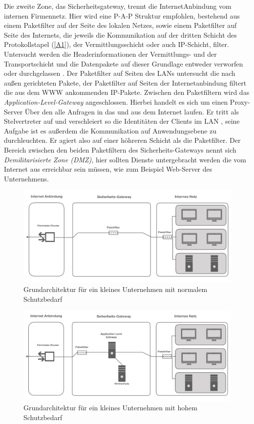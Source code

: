 Die zweite Zone, das Sicherheitsgateway, trennt die InternetAnbindung vom internen Firmennetz. Hier wird eine P-A-P Struktur empfohlen, bestehend aus einem Paketfilter auf der Seite des lokalen Netzes, sowie einem Paketfilter auf Seite des Internets, die jeweils die Kommunikation auf der dritten Schicht des Protokollstapel (\ref{A1}), der Vermittlungsschicht oder auch IP-Schicht, filter. Untersucht werden die Headerinformationen der Vermittlungs- und der Transportschicht und die Datenpakete auf dieser Grundlage entweder verworfen oder durchgelassen  \cite{isi-lana}.
 Der Paketfilter auf Seiten des LANs untersucht die nach außen gerichteten Pakete, der Paketfilter auf Seiten der Internetanbindung filtert die aus dem WWW ankommenden IP-Pakete. Zwischen den Paketfiltern wird das \emph{Application-Level-Gateway} angeschlossen. Hierbei handelt es sich um einen Proxy-Server Über den alle Anfragen in das und aus dem Internet laufen. Er tritt als Stelvertreter auf und verschleiert so die Identitäten der  Clients im LAN \cite{zisler2018computer}, seine Aufgabe ist es außerdem die Kommunikation auf Anwendungsebene zu durchleuchten. Er agiert also auf einer höhreren Schicht als die Paketfilter. 
 Der Bereich zwischen den beiden Paketfiltern des Sicherheits-Gateways nennt sich \emph{Demilitarisierte Zone (DMZ)}, hier sollten Dienste untergebracht werden die vom Internet aus erreichbar sein müssen, wie zum Beispiel Web-Server des Unternehmens. 
 

\begin{figure}
	\includegraphics[width=\linewidth]{klUnternHoch.jpeg}
	\caption{Grundarchitektur für ein kleines Unternehmen mit normalem Schutzbedarf}
	\label{klUnorm}
\end{figure}

\begin{figure}
	\includegraphics[width= \linewidth]{klUnternehmnorm}
	\caption{Grundarchitektur für ein kleines Unternehmen mit hohem Schutzbedarf}
	\label{klUhoch}
\end{figure}
